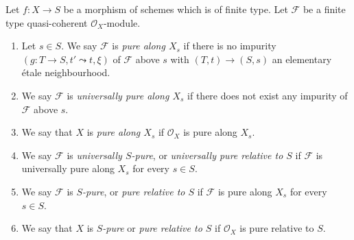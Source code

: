 \begin{definition}
\label{definition-pure}
Let $f : X \to S$ be a morphism of schemes which is of finite type.
Let $\mathcal{F}$ be a finite type quasi-coherent $\mathcal{O}_X$-module.
\begin{enumerate}
\item Let $s \in S$. We say $\mathcal{F}$ is {\it pure along $X_s$}
if there is no impurity $(g : T \to S, t' \leadsto t, \xi)$
of $\mathcal{F}$ above $s$ with $(T, t) \to (S, s)$ an
elementary \'etale neighbourhood.
\item We say $\mathcal{F}$ is {\it universally pure along $X_s$}
if there does not exist any impurity of $\mathcal{F}$ above $s$.
\item We say that $X$ is {\it pure along $X_s$} if $\mathcal{O}_X$
is pure along $X_s$.
\item We say $\mathcal{F}$ is {\it universally $S$-pure}, or
{\it universally pure relative to $S$} if $\mathcal{F}$ is universally
pure along $X_s$ for every $s \in S$.
\item We say $\mathcal{F}$ is {\it $S$-pure}, or
{\it pure relative to $S$} if $\mathcal{F}$ is pure along $X_s$
for every $s \in S$.
\item We say that $X$ is {\it $S$-pure} or {\it pure relative to $S$}
if $\mathcal{O}_X$ is pure relative to $S$.
\end{enumerate}
\end{definition}